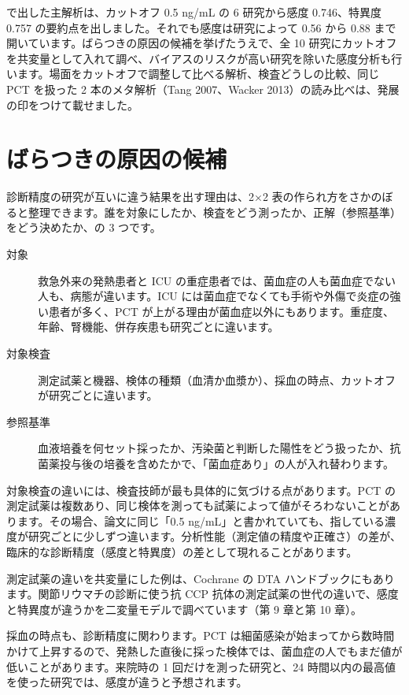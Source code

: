 \begin{chapintro}
で出した主解析は、カットオフ 0.5 ng/mL の 6 研究から感度 0.746、特異度 0.757 の要約点を出しました。それでも感度は研究によって 0.56 から 0.88 まで開いています。ばらつきの原因の候補を挙げたうえで、全 10 研究にカットオフを共変量として入れて調べ、バイアスのリスクが高い研究を除いた感度分析も行います。場面をカットオフで調整して比べる解析、検査どうしの比較、同じ PCT を扱った 2 本のメタ解析（Tang 2007、Wacker 2013）の読み比べは、発展の印をつけて載せました。
\end{chapintro}

\section{ばらつきの原因の候補}
\label{sec:14-1}

診断精度の研究が互いに違う結果を出す理由は、2×2 表の作られ方をさかのぼると整理できます。誰を対象にしたか、検査をどう測ったか、正解（参照基準）をどう決めたか、の 3 つです。

\begin{description}
\item[対象] 救急外来の発熱患者と ICU の重症患者では、菌血症の人も菌血症でない人も、病態が違います。ICU には菌血症でなくても手術や外傷で炎症の強い患者が多く、PCT が上がる理由が菌血症以外にもあります。重症度、年齢、腎機能、併存疾患も研究ごとに違います。
\item[対象検査] 測定試薬と機器、検体の種類（血清か血漿か）、採血の時点、カットオフが研究ごとに違います。
\item[参照基準] 血液培養を何セット採ったか、汚染菌と判断した陽性をどう扱ったか、抗菌薬投与後の培養を含めたかで、「菌血症あり」の人が入れ替わります。
\end{description}

対象検査の違いには、検査技師が最も具体的に気づける点があります。PCT の測定試薬は複数あり、同じ検体を測っても試薬によって値がそろわないことがあります。その場合、論文に同じ「0.5 ng/mL」と書かれていても、指している濃度が研究ごとに少しずつ違います。分析性能（測定値の精度や正確さ）の差が、臨床的な診断精度（感度と特異度）の差として現れることがあります。

測定試薬の違いを共変量にした例は、Cochrane の DTA ハンドブックにもあります。関節リウマチの診断に使う抗 CCP 抗体の測定試薬の世代の違いで、感度と特異度が違うかを二変量モデルで調べています（第 9 章と第 10 章）。

採血の時点も、診断精度に関わります。PCT は細菌感染が始まってから数時間かけて上昇するので、発熱した直後に採った検体では、菌血症の人でもまだ値が低いことがあります。来院時の 1 回だけを測った研究と、24 時間以内の最高値を使った研究では、感度が違うと予想されます。

